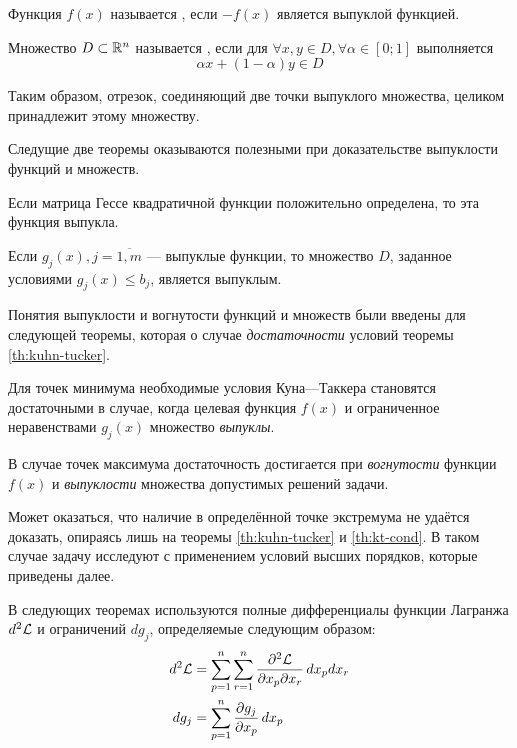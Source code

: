 \begin{dfn}
  Функция $f(x)$ называется , если $-f(x)$ является
  выпуклой функцией.
\end{dfn}

\begin{dfn}
  Множество $D \subset \mathbb{R}^n$ называется , если
  для $\forall x, y \in D, \forall \alpha \in [0;1]$ выполняется
  \begin{equation*}
    \alpha x + (1-\alpha) y \in D
  \end{equation*}
\end{dfn}
Таким образом, отрезок, соединяющий две точки выпуклого множества,
целиком принадлежит этому множеству.

Следущие две теоремы оказываются полезными при доказательстве
выпуклости функций и множеств.

\begin{thm}
  \label{th:convex-f}
  Если матрица Гессе квадратичной функции положительно определена, то
  эта функция выпукла.
\end{thm}

\begin{thm}
  \label{th:convex-set}
  Если $g_j(x), j=\overline{1,m}$ — выпуклые функции, то множество
  $D$, заданное условиями $g_j(x) \leq b_j$, является выпуклым.
\end{thm}

Понятия выпуклости и вогнутости функций и множеств были введены для
следующей теоремы, которая о случае \emph{достаточности} условий
теоремы \ref{th:kuhn-tucker}.

\begin{thm}
  \label{th:kt-cond}
  Для точек минимума необходимые условия Куна—Таккера становятся
  достаточными в случае, когда целевая функция $f(x)$ и ограниченное
  неравенствами $g_j(x)$ множество \emph{выпуклы}.

  В случае точек максимума достаточность достигается при
  \emph{вогнутости} функции $f(x)$ и \emph{выпуклости} множества
  допустимых решений задачи.
\end{thm}

Может оказаться, что наличие в определённой точке экстремума не
удаётся доказать, опираясь лишь на теоремы \ref{th:kuhn-tucker} и
\ref{th:kt-cond}. В таком случае задачу исследуют с применением
условий высших порядков, которые приведены далее.

В следующих теоремах используются полные дифференциалы функции
Лагранжа $d^2\mathcal{L}$ и ограничений $dg_j$, определяемые следующим
образом:
\begin{align*}
  d^2\mathcal{L} &= \sum_{p=1}^n\sum_{r=1}^n{\frac{\partial^2{\mathcal{L}}}{\partial{x_p}\partial{x_r}}\,dx_pdx_r} \\
  dg_j &= \sum_{p=1}^n{\frac{\partial{g_j}}{\partial{x_p}}\,dx_p}
\end{align*}

